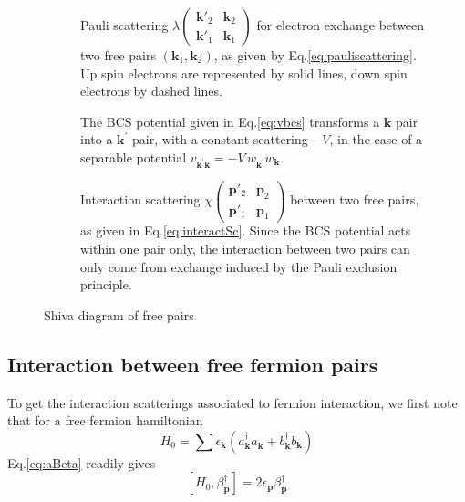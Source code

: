 \documentclass[aps,prb,superscriptaddress,twocolumn]{revtex4}
\newcommand{\vk}{\ensuremath{\mathbf{k}}}
\newcommand{\vp}{\ensuremath{\mathbf{p}}}
\begin{document}
\begin{figure}[htb]
\caption{Shiva diagram of free pairs }\centering
\par
\par
\begin{description}
\item[] Pauli scattering $\lambda\left(%
\begin{smallmatrix}\vk'_2&\vk_2\\\vk'_1&\vk_1\end{smallmatrix}\right)  $ for
electron exchange between two free pairs $\left(\mathbf{k} _1,\mathbf{k}
_2\right) $, as given by Eq.\eqref{eq:pauliscattering}. Up spin electrons
are represented by solid lines, down spin electrons by dashed lines. 
\par
\item[] The BCS potential given in Eq.\eqref{eq:vbcs}
transforms a $\mathbf{k} $ pair into a $\mathbf{k} ^{\prime}$ pair, with a
constant scattering $-V$, in the case of a separable potential $v_{\mathbf{k}
^{\prime}\mathbf{k} }=-V\,w_{\mathbf{k} ^{\prime}}w_{\mathbf{k} }$.
\par
\item[] Interaction scattering $\chi\left(%
\begin{smallmatrix}\vp'_2&\vp_2\\\vp'_1&\vp_1\end{smallmatrix}\right)  $
between two free pairs, as given in Eq.\eqref{eq:interactSc}. Since the BCS
potential acts within one pair only, the interaction between two pairs can
only come from exchange induced by the Pauli exclusion principle. 
\end{description}

\end{figure}

\subsection{Interaction between free fermion pairs}

To get the interaction scatterings associated to fermion interaction, we
first note that for a free fermion hamiltonian 
\begin{equation}  \label{eq:h0}
H_0=\sum{\epsilon_\vk\left(a^{\dagger}_{\mathbf{k} } a^{}_{\mathbf{k}
}+b^{\dagger}_{\mathbf{k} } b^{}_{\mathbf{k} }\right) }
\end{equation}
Eq.\eqref{eq:aBeta} readily gives 
\begin{equation}  \label{eq:betaH}
\left[H_0,\beta^{\dagger}_\vp\right]  =2\epsilon_\vp\beta^{\dagger}_\vp
\end{equation}
\end{document}
